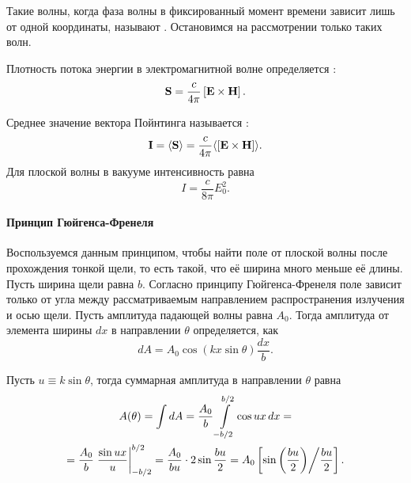 Такие волны, когда фаза волны в фиксированный момент времени зависит лишь от одной координаты, называют . Остановимся на рассмотрении только таких волн.

Плотность потока энергии в электромагнитной волне определяется :
\begin{equation}
	\mathbf{S} = \frac{c}{4\pi} \left[\mathbf{E} \times \mathbf{H}\right].
\end{equation}

Среднее значение вектора Пойнтинга называется :
\begin{equation}
	\mathbf{I} = \langle \mathbf{S}\rangle = \frac{c}{4\pi} \langle \left[\mathbf{E} \times \mathbf{H}\right] \rangle.
\end{equation}
Для плоской волны в вакууме интенсивность равна
\begin{equation}
	I = \frac{c}{8\pi} E_0^2.
\end{equation}

\paragraph{Принцип Гюйгенса-Френеля}

Воспользуемся данным принципом, чтобы найти поле от плоской волны после прохождения тонкой щели, то есть такой, что её ширина много меньше её длины. Пусть ширина щели равна $b$. Согласно принципу Гюйгенса-Френеля поле зависит только от угла между рассматриваемым направлением распространения излучения и осью щели. Пусть амплитуда падающей волны равна $A_0$. Тогда амплитуда от элемента ширины $dx$ в направлении $\theta$ определяется, как
\begin{equation*}
	dA = A_0 \cos (k x \sin \theta) \frac{dx}{b}.
\end{equation*}

Пусть $u \equiv k \sin \theta$, тогда суммарная амплитуда в направлении $\theta$ равна
\begin{multline*}
	A(\theta)
	= \int dA
	= \frac{A_0}{b} \int\limits_{-b/2}^{b/2} \cos ux\,dx =\\
	= \frac{A_0}{b} \left. \frac{\sin ux}{u} \right|_{-b/2}^{b/2}
	= \frac{A_0}{bu} \cdot 2 \sin \frac{bu}{2} = A_0 \left[ \sin \left( \frac{bu}{2}\right) \middle/  \frac{bu}{2} \right] .
\end{multline*}


